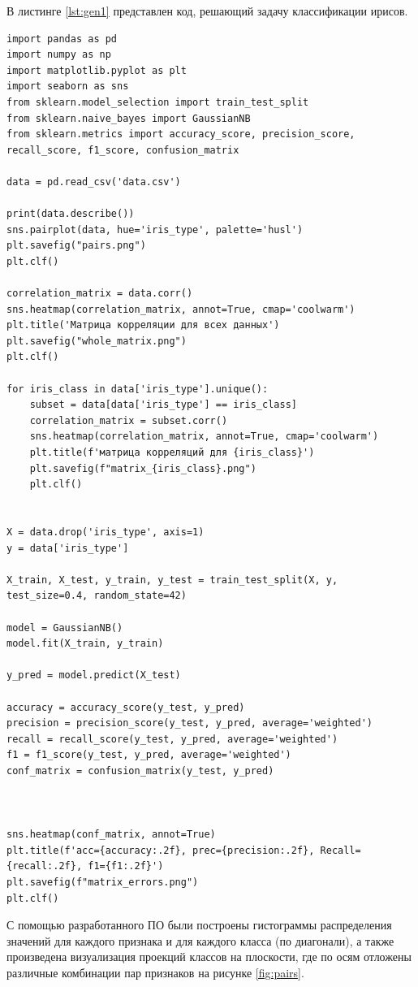 \documentclass[12pt]{report}
\begin{document}
В листинге \ref{lst:gen1} представлен код, решающий задачу классификации ирисов.

\begin{lstlisting}[label=lst:gen1,caption=Код классификации ирисов]
import pandas as pd
import numpy as np
import matplotlib.pyplot as plt
import seaborn as sns
from sklearn.model_selection import train_test_split
from sklearn.naive_bayes import GaussianNB
from sklearn.metrics import accuracy_score, precision_score, recall_score, f1_score, confusion_matrix

data = pd.read_csv('data.csv')

print(data.describe())
sns.pairplot(data, hue='iris_type', palette='husl')
plt.savefig("pairs.png")
plt.clf()

correlation_matrix = data.corr()
sns.heatmap(correlation_matrix, annot=True, cmap='coolwarm')
plt.title('Матрица корреляции для всех данных')
plt.savefig("whole_matrix.png")
plt.clf()

for iris_class in data['iris_type'].unique():
    subset = data[data['iris_type'] == iris_class]
    correlation_matrix = subset.corr()
    sns.heatmap(correlation_matrix, annot=True, cmap='coolwarm')
    plt.title(f'матрица корреляций для {iris_class}')
    plt.savefig(f"matrix_{iris_class}.png")
    plt.clf()


X = data.drop('iris_type', axis=1)
y = data['iris_type']

X_train, X_test, y_train, y_test = train_test_split(X, y, test_size=0.4, random_state=42)

model = GaussianNB()
model.fit(X_train, y_train)

y_pred = model.predict(X_test)

accuracy = accuracy_score(y_test, y_pred)
precision = precision_score(y_test, y_pred, average='weighted')
recall = recall_score(y_test, y_pred, average='weighted')
f1 = f1_score(y_test, y_pred, average='weighted')
conf_matrix = confusion_matrix(y_test, y_pred)



sns.heatmap(conf_matrix, annot=True)
plt.title(f'acc={accuracy:.2f}, prec={precision:.2f}, Recall={recall:.2f}, f1={f1:.2f}')
plt.savefig(f"matrix_errors.png")
plt.clf()
\end{lstlisting}

\newpage
С помощью разработанного ПО были построены гистограммы распределения значений для каждого признака и для каждого класса (по диагонали), а также произведена визуализация проекций классов на плоскости, где по осям  отложены различные комбинации пар признаков на рисунке \ref{fig:pairs}. 
\end{document}
